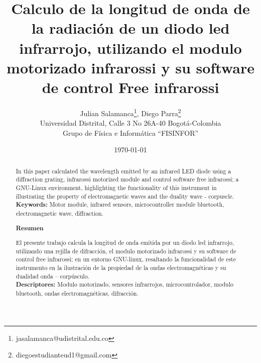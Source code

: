 \documentclass[12]{article}
\title{\bf{Calculo de la longitud de onda de la radiación de un diodo led infrarrojo, utilizando el modulo motorizado infrarossi y su software de control Free infrarossi}}
\author{Julian Salamanca\footnote{jasalamanca@udistrital.edu.co}, Diego Parra\footnote{diegoestudianteud1@gmail.com} \\
  Universidad Distrital, Calle 3 No 26A-40 Bogotá-Colombia\\
  Grupo de Física e Informática ``FISINFOR''
}
\date{\today}
\def\tablename{Tabla}%
\begin{document}
\renewcommand{\tablename}{Tabla}
\maketitle
\vspace{-0.8cm}

\begin{abstract}
In this paper calculated the wavelength emitted by  an infrared LED diode using a diffraction grating, infrarossi motorized module and control software  free infrarossi; a GNU-Linux environment, highlighting the functionality of this instrument in illustrating the property of electromagnetic waves and the duality wave - corpuscle. \\
{\bf{Keywords:}} Motor module, infrared sensors, microcontroller module bluetooth, electromagnetic wave, diffraction.


\begin{center}
{\bf{Resumen}} 
\end{center}
El presente trabajo calcula la longitud de onda emitida por un diodo led infrarrojo, utilizando una rejilla de difracción, el modulo motorizado  infrarossi y su software de control free infrarossi; en un entorno GNU-linux, resaltando la funcionalidad de este instrumento en la ilustración de la propiedad de la ondas electromagnéticas y su dualidad onda – corpúsculo. \\
{\bf{Descriptores:}} Modulo motorizado, sensores infrarrojos, microcontrolador, modulo bluetooth, ondas electromagnéticas, difracción. 
\end{abstract}



\end{document}
